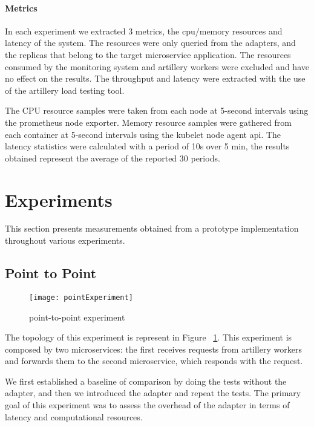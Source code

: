 \paragraph{Metrics}

In each experiment we extracted 3 metrics, the cpu/memory resources and latency of the system.
The resources were only queried from the adapters, and the replicas that belong to the target microservice application.
The resources consumed by the monitoring system and artillery workers were excluded and have no effect
on the results.
The throughput and latency were extracted with the use of the artillery load testing tool.

The CPU resource samples were taken from each node at 5-second intervals using the prometheus node exporter.
Memory resource samples were gathered from each container at 5-second intervals using the kubelet node agent api.
The latency statistics were calculated with a period of 10s over 5 min, the results obtained represent the
average of the reported 30 periods.

\section{Experiments} %
\label{sec:experiments}

This section presents measurements obtained from a prototype implementation throughout various experiments.


\subsection{Point to Point} %
\label{sec:point to point}

\begin{figure}[htbp]
    \centering
    \texttt{[image: pointExperiment]}
    \caption{point-to-point experiment}
    \label{fig:point}
\end{figure}

The topology of this experiment is represent in Figure ~\ref{fig:point}.
This experiment is composed by two microservices:
the first receives requests from artillery workers and forwards them to the second microservice, which responds with the request.

We first established a baseline of comparison
by doing the tests without the adapter, and then we introduced the adapter and repeat the tests.
The primary goal of this experiment was to assess the overhead of the adapter in terms of latency and computational resources.

